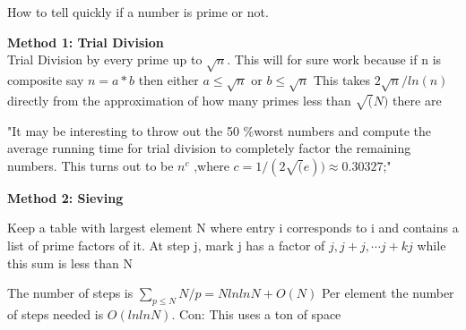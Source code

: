 \documentclass{article}
\begin{document}


\setcounter{section}{2}
\section{}


How to tell quickly if a number is prime or not. 

\textbf{Method 1: Trial Division} \\
Trial Division by every prime up to $\sqrt{n}$. This will for sure work because if n is composite say $n = a * b $ then either $a \leq \sqrt{n}$ or $b \leq \sqrt{n}$ This takes $2 \sqrt{n} / ln(n)$ directly from the approximation of how many primes less than $\sqrt(N)$ there are


"It may be interesting to throw out the 50 \%worst numbers and compute the average running time for trial division to completely factor the remaining numbers. This turns out to be $n^c$ ,where $c=1/(2\sqrt(e)) \approx 0.30327$;"

\textbf{ Method 2: Sieving}

Keep a table with largest element N where entry i corresponds to i and contains a list of prime factors of it. At step j, mark j has a factor of $j, j + j,  \cdots j + k j $ while this sum is less than  N

The number of steps is $\sum_{p \leq N} N/p = N ln ln N + O(N)$
Per element the number of steps needed is $O ( ln ln N )$. 
Con: This uses a ton of space 
\end{document}
